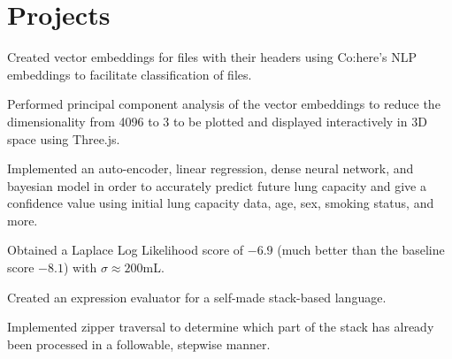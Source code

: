 \section{Projects}

\begin{resumeItem}
\begin{resumeList}
    \item Created vector embeddings for files with their headers using Co:here's NLP embeddings to facilitate classification of files.
    \item Performed principal component analysis of the vector embeddings to reduce the dimensionality from 4096 to 3 to be plotted and displayed interactively in 3D space using Three.js.
\end{resumeList}
\end{resumeItem}

\begin{resumeItem}
\begin{resumeList}
    \item Implemented an auto-encoder, linear regression, dense neural network, and bayesian model in order to accurately predict future lung capacity and give a confidence value using initial lung capacity data, age, sex, smoking status, and more.
    \item Obtained a Laplace Log Likelihood score of $-6.9$ (much better than the baseline score $-8.1$) with $\sigma \approx 200$mL.
\end{resumeList}
\end{resumeItem}

\begin{resumeItem}
\begin{resumeList}
    \item Created an expression evaluator for a self-made stack-based language.
    \item Implemented zipper traversal to determine which part of the stack has already been processed in a followable, stepwise manner.
\end{resumeList}
\end{resumeItem}

